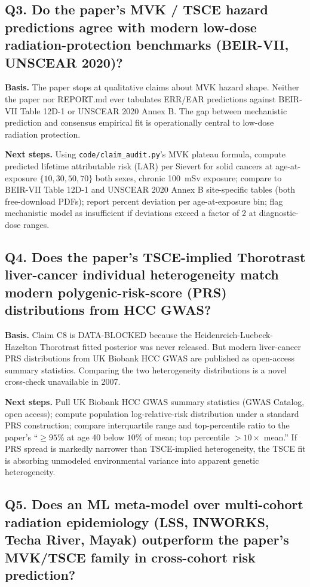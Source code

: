 \subsection*{Q3. Do the paper's MVK / TSCE hazard predictions agree with
modern low-dose radiation-protection benchmarks (BEIR-VII, UNSCEAR
2020)?}

\textbf{Basis.} The paper stops at qualitative claims about MVK hazard
shape. Neither the paper nor REPORT.md ever tabulates ERR/EAR
predictions against BEIR-VII Table 12D-1 or UNSCEAR 2020 Annex B. The
gap between mechanistic prediction and consensus empirical fit is
operationally central to low-dose radiation protection.

\textbf{Next steps.} Using \texttt{code/claim\_audit.py}'s MVK plateau
formula, compute predicted lifetime attributable risk (LAR) per Sievert
for solid cancers at age-at-exposure $\{10,30,50,70\}$ both sexes,
chronic 100~mSv exposure; compare to BEIR-VII Table 12D-1 and UNSCEAR
2020 Annex B site-specific tables (both free-download PDFs); report
percent deviation per age-at-exposure bin; flag mechanistic model as
insufficient if deviations exceed a factor of 2 at diagnostic-dose
ranges.

\subsection*{Q4. Does the paper's TSCE-implied Thorotrast liver-cancer
individual heterogeneity match modern polygenic-risk-score (PRS)
distributions from HCC GWAS?}

\textbf{Basis.} Claim C8 is DATA-BLOCKED because the Heidenreich-Luebeck-
Hazelton Thorotrast fitted posterior was never released. But modern
liver-cancer PRS distributions from UK Biobank HCC GWAS are published
as open-access summary statistics. Comparing the two heterogeneity
distributions is a novel cross-check unavailable in 2007.

\textbf{Next steps.} Pull UK Biobank HCC GWAS summary statistics (GWAS
Catalog, open access); compute population log-relative-risk
distribution under a standard PRS construction; compare interquartile
range and top-percentile ratio to the paper's ``$\geq 95\%$ at age 40
below $10\%$ of mean; top percentile $>10\times$ mean.'' If PRS spread
is markedly narrower than TSCE-implied heterogeneity, the TSCE fit is
absorbing unmodeled environmental variance into apparent genetic
heterogeneity.

\subsection*{Q5. Does an ML meta-model over multi-cohort radiation
epidemiology (LSS, INWORKS, Techa River, Mayak) outperform the paper's
MVK/TSCE family in cross-cohort risk prediction?}

